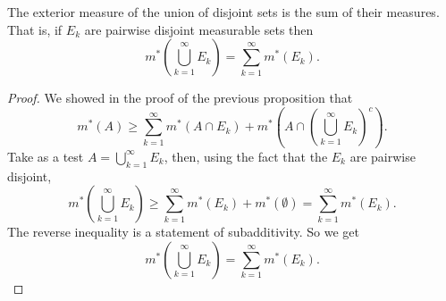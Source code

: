 \documentclass[12pt,oneside]{book}
\numberwithin{table}{section}
\numberwithin{equation}{section}
\numberwithin{figure}{section}
\newcommand{\ext}[1]{m^* \! \left( #1 \right)}
\begin{document}
\begin{proposition}
	The exterior measure of the union of disjoint sets is the sum of their measures. That is, if \( E_k \) are pairwise disjoint measurable sets then
	\begin{equation*}
		\ext{\bigcup_{k = 1}^\infty E_k} = \sum_{k = 1}^{\infty} \ext{E_k}. 
	\end{equation*}
\end{proposition}
\begin{proof}
	We showed in the proof of the previous proposition that
	\begin{equation*}
		\ext{A} \geq \sum_{k = 1}^\infty \ext{A \cap E_k} + \ext{A \cap \left(\bigcup_{k = 1}^\infty E_k\right)^c}.
	\end{equation*}
	Take as a test \( A = \bigcup_{k = 1}^\infty E_k \), then, using the fact that the \( E_k \) are pairwise disjoint,
	\begin{equation*}
		\ext{\bigcup_{k = 1}^\infty E_k} \geq \sum_{k = 1}^\infty \ext{E_k} + \ext{\emptyset} = \sum_{k = 1}^\infty \ext{E_k}.
	\end{equation*}
	The reverse inequality is a statement of subadditivity. So we get
	\begin{equation*}
		\ext{\bigcup_{k = 1}^\infty E_k} = \sum_{k = 1}^\infty \ext{E_k}.
	\end{equation*}
\end{proof}
\end{document}

